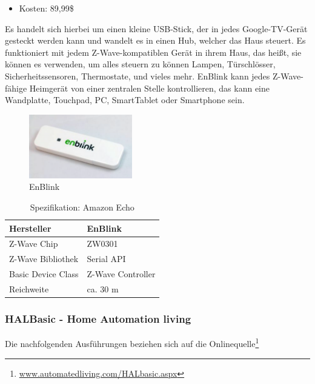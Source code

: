 \begin{itemize}
\item Kosten: 89,99\$
\end{itemize}

\noindent
Es handelt sich hierbei um einen kleine USB-Stick, der in jedes Google-TV-Gerät gesteckt werden kann und wandelt es in einen Hub, welcher das Haus steuert. Es funktioniert mit jedem Z-Wave-kompatiblen Gerät in ihrem Haus, das heißt, sie können es verwenden, um alles steuern zu können Lampen, Türschlösser, Sicherheitssensoren, Thermostate, und vieles mehr. EnBlink kann jedes Z-Wave-fähige Heimgerät von einer zentralen Stelle kontrollieren, das kann eine Wandplatte, Touchpad, PC, SmartTablet oder Smartphone sein.

\begin{figure}[h!]
	\centering
	\includegraphics[width=0.4\textwidth]{img/Feedback-Mechanismen/EnBlink.png}
	\caption{EnBlink}
	\label{fig:feedbackEnBlink}
\end{figure}

\begin{table}[H]
	\begin{tabularx}{\textwidth}{
			>{\hsize=0.5\hsize}X 
			>{\hsize=1.5\hsize}X
		}
		\hline
		Hersteller	
		& EnBlink \\
		\hline 
	 	Z-Wave Chip
		& ZW0301 \\
		\hline 
	 	Z-Wave Bibliothek
		& Serial API \\
		\hline 
	 	Basic Device Class
		& Z-Wave Controller \\
		\hline 
	 	Reichweite
		& ca. 30 m \\
		\hline 
	\end{tabularx}
	\caption{Spezifikation: Amazon Echo}
\end{table}

\subsubsection{HALBasic - Home Automation living}
Die nachfolgenden Ausführungen beziehen sich auf die Onlinequelle\footnote{\url{www.automatedliving.com/HALbasic.aspx}}

